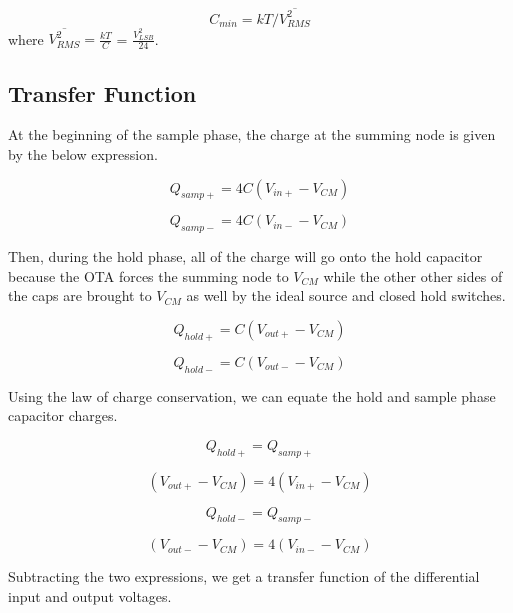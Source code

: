 \documentclass{article}
\begin{document}
\begin{equation}
C_{min} = kT/\overline{V_{RMS}^{2}}
\end{equation}
where $\overline{V_{RMS}^{2}} = \frac{kT}{C}$ = $\frac{V_{LSB}^{2}}{24}$.

\subsection{Transfer Function}
At the beginning of the sample phase, the charge at the summing node is given by the below expression.

\begin{equation}
Q_{samp+} = 4C\left(V_{in+}-V_{CM}\right)
\end{equation}

\begin{equation}
Q_{samp-} = 4C\left(V_{in-}-V_{CM}\right)
\end{equation}

Then, during the hold phase, all of the charge will go onto the hold capacitor because the OTA forces the summing node to $V_{CM}$ while the other other sides of the caps are brought to $V_{CM}$ as well by the ideal source and closed hold switches.

\begin{equation}
Q_{hold+} = C\left(V_{out+}-V_{CM}\right)
\end{equation}

\begin{equation}
Q_{hold-} = C\left(V_{out-}-V_{CM}\right)
\end{equation}

Using the law of charge conservation, we can equate the hold and sample phase capacitor charges.

\begin{equation}
Q_{hold+} = Q_{samp+}
\end{equation}

\begin{equation}
\left(V_{out+}-V_{CM}\right) = 4\left(V_{in+}-V_{CM}\right)
\end{equation}

\begin{equation}
Q_{hold-} = Q_{samp-}
\end{equation}

\begin{equation}
\left(V_{out-}-V_{CM}\right) = 4\left(V_{in-}-V_{CM}\right)
\end{equation}

Subtracting the two expressions, we get a transfer function of the differential input and output voltages.
\end{document}
